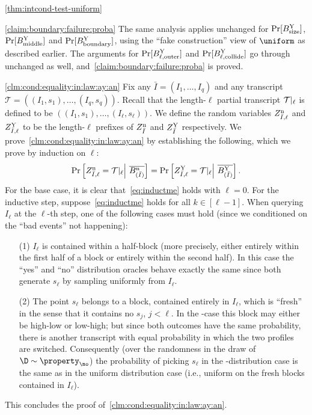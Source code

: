 \begin{proofof}{\cref{thm:intcond-test-uniform}}
\begin{proofof}{\cref{claim:boundary:failure:proba}}
The same analysis applies unchanged for
$\Pr[ B^{\rm Y}_{\rm size} ]$, $\Pr[ B^{\rm Y}_{\rm middle} ]$ and $\Pr[  B^{\rm Y}_{\rm boundary} ]$,
using the ``fake construction'' view of $\uniform$ as described earlier.
The arguments for $\Pr[B^{\rm Y}_{\ell, \rm outer}]$ and
$\Pr[B^{\rm Y}_{\ell, \rm collide}]$ go through unchanged as well,
and~\cref{claim:boundary:failure:proba} is proved.
\end{proofof}
\begin{proofof}{\cref{clm:cond:equality:in:law:ay:an}}
Fix any $\bar{I}=(I_1,\dots,I_q)$ and any transcript
$\mathcal{T}=((I_1,s_1),\dots,(I_q,s_q))$. Recall that the length-$\ell$ partial transcript ${\cal T}|_\ell$
is defined to be $((I_1,s_1),\dots,(I_\ell,s_\ell))$.
We define the random variables
$Z^{\rm n}_{\bar{I},\ell}$
and
$Z^{\rm Y}_{\bar{I},\ell}$
to be the length-$\ell$ prefixes of
$Z^{\rm n}_{\bar{I}}$
and
$Z^{\rm Y}_{\bar{I}}$
respectively.
We prove~\cref{clm:cond:equality:in:law:ay:an} by
establishing the following, which we prove by induction on $\ell$:
\begin{equation}
\Pr\left[ Z^{\rm n}_{\bar{I},\ell} = \mathcal{T}|_\ell \Big|\
\overline{ B^{\rm n}_{(\bar{I})} } \right] = \Pr\left[ Z^{\rm Y}_{\bar{I},\ell}
= \mathcal{T}|_\ell \Big|\ \overline{ B^{\rm Y}_{(\bar{I})} } \right].
\label{eq:inductme}
\end{equation}
For the base case, it is clear that~\eqref{eq:inductme} holds with
$\ell = 0.$
For the inductive step, suppose~\eqref{eq:inductme} holds for all $k\in[\ell-1]$.
When querying $I_\ell$ at the $\ell$-th step,
one of the following cases must hold (since we conditioned on the
``bad events'' not happening):

\begin{itemize}

\item [(1)] $I_\ell$ is contained within a half-block
(more precisely, either entirely within the first half of a block
or entirely within the second half). In this case the
``{yes}'' and ``{no}'' distribution oracles behave {exactly} the same
since both generate $s_{\ell}$ by sampling uniformly from $I_{\ell}.$

\item [(2)]
The point $s_\ell$ belongs to a
block, contained entirely in $I_{\ell}$, which is ``fresh'' in the sense
that it contains no $s_j$, $j < \ell.$ In the \no-case
this block may either be high-low or low-high; but since both outcomes
have the same probability, there is another transcript with equal
probability in which the two profiles are switched.  Consequently
(over the randomness in the draw of $\D \sim \property_{\no}$)
the probability of picking $s_\ell$ in the \no-distribution case is
the same as in the uniform distribution case (i.e., uniform on the fresh blocks contained in $I_\ell$).
\end{itemize}
\noindent This concludes the proof of~\cref{clm:cond:equality:in:law:ay:an}.
\end{proofof}


\end{proofof}
